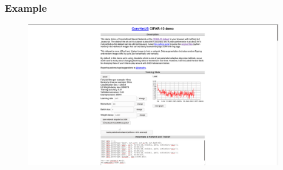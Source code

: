 \documentclass{beamer}
\begin{document}
\begin{frame}
\frametitle{Example}
\begin{figure}

	\includegraphics[width=\linewidth]{Pics/cnnex.png}
\end{figure}

\end{frame}
	
	
	
\end{document}
